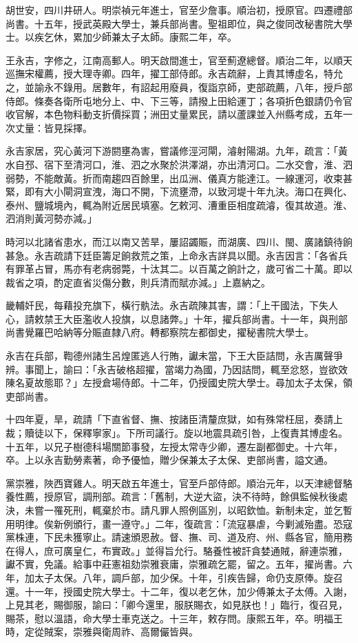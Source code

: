 \begin{pinyinscope}
胡世安，四川井研人。明崇禎元年進士，官至少詹事。順治初，授原官。四遷禮部尚書。十五年，授武英殿大學士，兼兵部尚書。聖祖即位，與之俊同改秘書院大學士。以疾乞休，累加少師兼太子太師。康熙二年，卒。

王永吉，字修之，江南高郵人。明天啟間進士，官至薊遼總督。順治二年，以順天巡撫宋權薦，授大理寺卿。四年，擢工部侍郎。永吉疏辭，上責其博虛名，特允之，並諭永不錄用。居數年，有詔起用廢員，復詣京師，吏部疏薦，八年，授戶部侍郎。條奏各衛所屯地分上、中、下三等，請撥上田給運丁；各項折色銀請仍令官收官解，本色物料動支折價採買；洲田丈量累民，請以蘆課並入州縣考成，五年一次丈量：皆見採擇。

永吉家居，究心黃河下游閼壅為害，嘗議修涇河閘，濬射陽湖。九年，疏言：「黃水自邳、宿下至清河口，淮、泗之水聚於洪澤湖，亦出清河口。二水交會，淮、泗弱勢，不能敵黃。折而南趨四百餘里，出瓜洲、儀真方能達江。一線運河，收束甚緊，即有大小閘洞宣洩，海口不開，下流壅滯，以致河堤十年九決。海口在興化、泰州、鹽城境內，輒為附近居民填塞。乞敕河、漕重臣相度疏濬，復其故道。淮、泗消則黃河勢亦減。」

時河以北諸省患水，而江以南又苦旱，屢詔蠲賑，而湖廣、四川、閩、廣諸鎮待餉甚急。永吉疏請下廷臣籌足餉救荒之策，上命永吉詳具以聞。永吉因言：「各省兵有罪革占冒，馬亦有老病弱斃，十汰其二。以百萬之餉計之，歲可省二十萬。即以裁省之項，酌定直省災傷分數，則兵清而賦亦減。」上嘉納之。

畿輔奸民，每藉投充旗下，橫行骫法。永吉疏陳其害，謂：「上干國法，下失人心，請敕禁王大臣濫收人投旗，以息諸弊。」十年，擢兵部尚書。十一年，與刑部尚書覺羅巴哈納等分賑直隸八府。轉都察院左都御史，擢秘書院大學士。

永吉在兵部，鞫德州諸生呂煌匿逃人行賄，讞未當，下王大臣詰問，永吉厲聲爭辨。事聞上，諭曰：「永吉破格超擢，當竭力為國，乃因詰問，輒至忿怒，豈欲效陳名夏故態耶？」左授倉場侍郎。十二年，仍授國史院大學士。尋加太子太保，領吏部尚書。

十四年夏，旱，疏請「下直省督、撫、按諸臣清釐庶獄，如有殊常枉屈，奏請上裁；贖徒以下，保釋寧家」。下所司議行。旋以地震具疏引咎，上復責其博虛名。十五年，以兄子樹德科場關節事發，左授太常寺少卿，遷左副都御史。十六年，卒。上以永吉勤勞素著，命予優恤，贈少保兼太子太保、吏部尚書，謚文通。

黨崇雅，陜西寶雞人。明天啟五年進士，官至戶部侍郎。順治元年，以天津總督駱養性薦，授原官，調刑部。疏言：「舊制，大逆大盜，決不待時，餘俱監候秋後處決，未嘗一罹死刑，輒棄於市。請凡罪人照例區別，以昭欽恤。新制未定，並乞暫用明律。俟新例頒行，畫一遵守。」二年，復疏言：「流寇暴虐，今剿滅殆盡。恐寇黨株連，下民未獲寧止。請速頒恩赦。督、撫、司、道及府、州、縣各官，簡用務在得人，庶可廣皇仁，布實政。」並得旨允行。駱養性被訐貪婪通賊，辭連崇雅，讞不實，免議。給事中莊憲祖劾崇雅衰庸，崇雅疏乞罷，留之。五年，擢尚書。六年，加太子太保。八年，調戶部，加少保。十年，引疾告歸，命仍支原俸。旋召還。十一年，授國史院大學士。十二年，復以老乞休，加少傅兼太子太傅。入謝，上見其老，賜御服，諭曰：「卿今還里，服朕賜衣，如見朕也！」臨行，復召見，賜茶，慰以溫語，命大學士車克送之。十三年，敕存問。康熙五年，卒。明福王時，定從賊案，崇雅與衛周祚、高爾儼皆與。


\end{pinyinscope}
